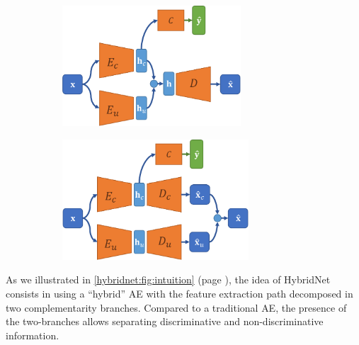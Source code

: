 \begin{figure}[t]
  \begin{subfigure}[t]{0.47\linewidth}
    \centering
    \includegraphics[height=4.5cm]{images/hybridnet_merge_early}
    \label{hybridnet:fig:fusion_early}
  \end{subfigure}
  \hfill
  \begin{subfigure}[t]{0.47\linewidth}
    \centering
    \includegraphics[height=4.5cm]{images/hybridnet_merge_late}
    \label{hybridnet:fig:fusion_late}
  \end{subfigure}
  \label{hybridnet:fig:fusion}
\end{figure}


As we illustrated in \autoref{hybridnet:fig:intuition} (page \pageref{hybridnet:fig:intuition}), the idea of HybridNet consists in using a ``hybrid'' \acf{AE} with the feature extraction path decomposed in two complementarity branches. Compared to a traditional \ac{AE}, the presence of the two-branches allows separating discriminative and non-discriminative information. 

